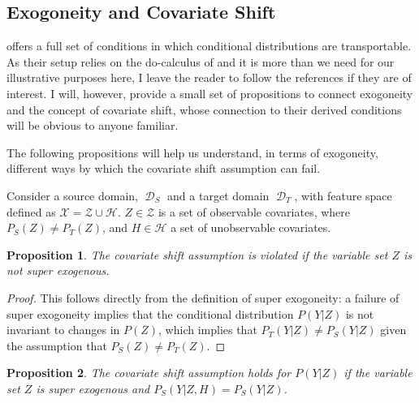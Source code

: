 \documentclass[a4paper,12pt]{article}
\newtheorem{prop}{Proposition}
\DeclareMathOperator*{\D}{\mathcal{D}}
\begin{document}



\subsection{ Exogoneity and Covariate Shift}

\cite{Pearl2014} offers a full set of conditions in which conditional distributions are transportable. As their setup relies on the do-calculus of \cite{Pearl2000} and it is more than we need for our illustrative purposes here, I leave the reader to follow the references if they are of interest. I will, however, provide a small set of propositions to connect exogoneity and the concept of covariate shift, whose connection to their derived conditions will be obvious to anyone familiar. 

The following propositions will help us understand, in terms of exogoneity, different ways by which the covariate shift assumption can fail. 

Consider a source domain, $\D_S$ and a target domain $\D_T$, with feature space defined as $\mathcal{X} = \mathcal{Z} \cup \mathcal{H}$. $Z \in \mathcal{Z}$ is a set of observable covariates, where $P_S(Z) \neq P_T(Z)$, and $H \in \mathcal{H}$ a set of unobservable covariates. 

\begin{prop}
  The covariate shift assumption is violated if the variable set $Z$ is not super exogenous.
\end{prop}

\begin{proof}
  This follows directly from the definition of super exogoneity: a failure of super exogoneity implies that the conditional distribution $P(Y|Z)$ is not invariant to changes in $P(Z)$, which implies that $P_T(Y|Z) \neq P_S(Y|Z)$ given the assumption that $P_S(Z) \neq P_T(Z)$.
\end{proof}

\begin{prop}
  The covariate shift assumption holds for $P(Y|Z)$ if the variable set $Z$ is super exogenous and $P_S(Y|Z, H) = P_S(Y | Z)$.
\end{prop}
\end{document}
